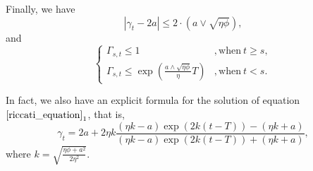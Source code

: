 \documentclass[10pt]{article}
\begin{document}
Finally, we have
\begin{equation}\label{gamma_expression}
    |\gamma_t - 2a| \leq 2 \cdot (a \vee \sqrt{\eta\phi}),
\end{equation}
and 
\begin{equation}\label{Gamma_bound}
    \left\{
    \begin{array}{ll}
    \Gamma_{s,t} \leq 1 &, \text{when}~t \geq s,\\
    \Gamma_{s,t} \leq \exp \left( \frac{a \wedge \sqrt{\eta\phi}}{\eta}T \right) &,  \text{when}~t < s.
    \end{array}
    \right.
\end{equation}

In fact, we also have an explicit formula for the solution of equation $\eqref{riccati_equation}_1$, that is,
\begin{equation}\label{defgamma}
    \gamma_t = 2a + 2\eta k \frac{(\eta k - a)\exp(2k(t-T)) - (\eta k + a)}{(\eta k - a)\exp(2k(t-T)) + (\eta k + a)},
\end{equation}
where $k = \sqrt{\frac{\eta\phi + a^2}{2\eta^2}}$.
\fi


\end{document}
